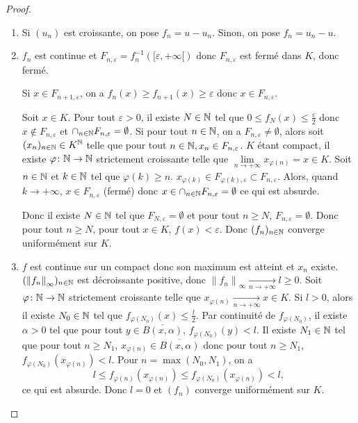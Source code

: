 \begin{proof}
    \phantom{}
    \begin{enumerate}
        \item Si $(u_n)$ est croissante, on pose $f_n=u-u_n$. Sinon, on pose $f_n=u_n-u$.
        \item $f_n$ est continue et $F_{n,\varepsilon}=f_{n}^{-1}\left([\varepsilon,+\infty[\right)$ donc $F_{n,\varepsilon}$ est fermé dans $K$, donc fermé. 
        
        Si $x\in F_{n+1,\varepsilon}$, on a $f_n(x)\geqslant f_{n+1}(x)\geqslant\varepsilon$ donc $x\in F_{n,\varepsilon}$. 
        
        Soit $x\in K$. Pour tout $\varepsilon>0$, il existe $N\in\mathbb{N}$ tel que $0\leqslant f_{N}(x)\leqslant\frac{\varepsilon}{2}$ donc $x\notin F_{n,\varepsilon}$ et $\cap_{n\in\mathbb{N}}F_{n,\varepsilon}=\emptyset$. Si pour tout $n\in\mathbb{N}$, on a $F_{n,\varepsilon}\neq\emptyset$, alors soit $(x_n)_{n\in\mathbb{N}}\in K^{\mathbb{N}}$ telle que pour tout $n\in\mathbb{N},x_n\in F_{n,\varepsilon}$. $K$ étant compact, il existe $\varphi\colon\mathbb{N}\to\mathbb{N}$ strictement croissante telle que $\lim\limits_{n\to+\infty}x_{\varphi(n)}=x\in K$. Soit $n\in\mathbb{N}$ et $k\in\mathbb{N}$ tel que $\varphi(k)\geqslant n$. $x_{\varphi(k)}\in F_{\varphi(k),\varepsilon}\subset F_{n,\varepsilon}$. Alors, quand $k\to+\infty$, $x\in F_{n,\varepsilon}$ (fermé) donc $x\in\cap_{n\in\mathbb{N}}F_{n,\varepsilon}=\emptyset$ ce qui est absurde.

        Donc il existe $N\in\mathbb{N}$ tel que $F_{N,\varepsilon}=\emptyset$ et pour tout $n\geqslant N$, $F_{n,\varepsilon}=\emptyset$. Donc pour tout $n\geqslant N$, pour tout $x\in K$, $f(x)<\varepsilon$. Donc $(f_n)_{n\in\mathbb{N}}$ converge uniformément sur $K$.

        \item $f$ est continue sur un compact donc son maximum est atteint et $x_{n}$ existe. $(\left\lVert f_n\right\rVert_{\infty})_{n\in\mathbb{N}}$ est décroissante positive, donc $\left\lVert f_n\right\rVert_{\infty}\xrightarrow[n\to+\infty]{}l\geqslant0$. Soit $\varphi\colon\mathbb{N}\to\mathbb{N}$ strictement croissante telle que $x_{\varphi(n)}\xrightarrow[n\to+\infty]{}x\in K$. Si $l>0$, alors il existe $N_{0}\in\mathbb{N}$ tel que $f_{\varphi(N_0)}(x)\leqslant\frac{l}{2}$. Par continuité de $f_{\varphi(N_0)}$, il existe $\alpha>0$ tel que pour tout $y\in\overline{B(x,\alpha)}$, $f_{\varphi(N_0)}(y)<l$. Il existe $N_{1}\in\mathbb{N}$ tel que pour tout $n\geqslant N_{1}$, $x_{\varphi(n)}\in\overline{B(x,\alpha)}$ donc pour tout $n\geqslant N_{1}$, $f_{\varphi(N_0)}(x_{\varphi(n)})<l$. Pour $n=\max(N_0,N_1)$, on a 
        \begin{equation}
            l\leqslant f_{\varphi(n)}(x_{\varphi(n)})\leqslant f_{\varphi(N_{0})}(x_{\varphi(n)})<l,
        \end{equation}
        ce qui est absurde. Donc $l=0$ et $(f_n)$ converge uniformément sur $K$.
    \end{enumerate}
\end{proof}